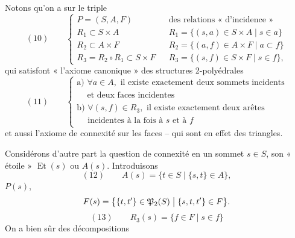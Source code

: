 \documentclass[11pt,a4paper]{article}
\begin{document}
Notons qu'on a sur le triple
\[
(10) \qquad
\left\{
\begin{array}{lll}
P = (S, A, F) & & \text{des relations « d'incidence »} \\[2pt]
R_1 \subset S \times A & & R_1 = \{ (s, a) \in S \times A \mid s \in a \} \\[2pt]
R_2 \subset A \times F & & R_2 = \{ (a, f) \in A \times F \mid a \subset f \} \\[2pt]
R_3 = R_2 \circ R_1 \subset S \times F & & R_3 = \{ (s, f) \in S \times F \mid s \in f \} ,
\end{array}
\right.
\]
qui satisfont « l'axiome canonique » des structures 2-polyédrales
\[
(11) \qquad
\left\{
\begin{array}{l}
\text{a) } \forall a \in A, \text{ il existe exactement deux sommets incidents} \\
\phantom{\text{a) }} \text{et deux faces incidentes} \\[2pt]
\text{b) } \forall (s, f) \in R_3, \text{ il existe exactement deux arêtes} \\
\phantom{\text{b) }} \text{incidentes à la fois à } s \text{ et à } f
\end{array}
\right.
\]
et aussi l'axiome de connexité sur les faces -- qui sont en effet des triangles.

Considérons d'autre part la question de connexité en un sommet $s \in S$,  son « étoile » $\operatorname{Et}(s)$ ou $A(s)$. Introduisons
\[
(12) \qquad A(s) = \{ t \in S \mid \{s, t\} \in A \} ,
\]
$P(s)$, \ill{}
\[
F(s) = \bigl\{ \{t, t'\} \in \mathfrak{P}_2(S) \bigm| \{s, t, t'\} \in F \bigr\} .
\]
\[
(13) \qquad R_3(s) = \{ f \in F \mid s \in f \}
\]
On a bien sûr des décompositions
\end{document}
